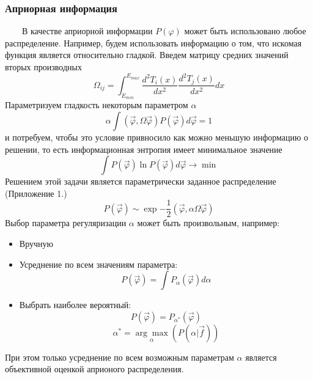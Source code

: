 \documentclass{config}
\begin{document}
\subsubsection{Априорная информация}
~~~~В качестве априорной информации $P(\varphi)$ может быть использовано любое распределение. Например, будем использовать информацию о том, что искомая функция является относительно гладкой. Введем матрицу средних значений вторых производных
\begin{equation}
    \Omega_{ij} = \int_{E_{min}}^{E_{max}}\frac{d^2 T_i(x)}{dx^2} \frac{d^2 T_j(x)}{dx^2} dx
\end{equation}
Параметризуем гладкость некоторым параметром $\alpha$
\begin{equation}
    \alpha \int (\vec{\varphi}, \Omega \vec{\varphi})P(\vec{\varphi}) d \vec{\varphi} = 1
\end{equation}
и потребуем, чтобы это условие привносило как можно меньшую информацию о решении, то есть информационная энтропия имеет минимальное значение
\begin{equation}
    \int P(\vec{\varphi})\ln{P(\vec{\varphi})} d \vec{\varphi} \rightarrow \min{}
\end{equation}
Решением этой задачи является параметрически заданное распределение (Приложение 1.)
\begin{equation}
    P(\vec{\varphi}) \sim \exp{-\frac{1}{2} (\vec{\varphi}, \alpha \Omega \vec{\varphi})}
\end{equation}
Выбор параметра регуляризации $\alpha$ может быть произвольным, например:
\begin{itemize}
    \item Вручную
    \item Усреднение по всем значениям параметра:
    \begin{equation}
        P(\vec{\varphi}) = \int P_{\alpha}(\vec{\varphi}) d \alpha
    \end{equation}
    \item Выбрать наиболее вероятный:
    \begin{equation}
        P(\vec{\varphi}) = P_{\alpha^*}(\vec{\varphi})
    \end{equation}
    \begin{equation}
        \alpha^* = \underset{\alpha}{\arg\max}(P(\alpha | \vec{f}))
    \end{equation}
\end{itemize}
При этом только усреднение по всем возможным параметрам $\alpha$ является объективной оценкой априоного распределения.
\end{document}
